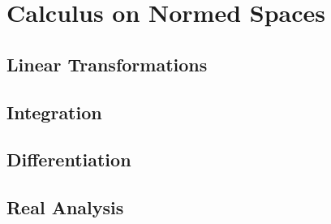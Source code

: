 \documentclass[crop=false,class=article,oneside]{standalone}
\begin{document}
    \ifx\ifworkmasterswork\undefined
        \section*{Calculus on Normed Spaces}
        \setcounter{section}{1}
    \fi
    \subsection{Linear Transformations}
    \subsection{Integration}
    \subsection{Differentiation}
    \subsection{Real Analysis}
\end{document}
